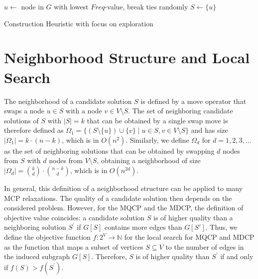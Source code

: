 \documentclass[draft,final]{vutinfth} %
\begin{document}
\begin{algorithm}
    \DontPrintSemicolon
    $u \gets $ node in $G$ with lowest $Freq$-value, break ties randomly \;
    $S \gets \{u\}$ \;
    \label{alg:exploration-construction-while-end}
    \caption{Construction Heuristic with focus on exploration}
    \label{alg:exploration-construction}
\end{algorithm}

\section{Neighborhood Structure and Local Search} \label{sec:neighborhood-structure}

The neighborhood of a candidate solution $S$ is defined by a move operator that swaps a node $u \in S$ with a node $v \in V \setminus S$. The set of neighboring candidate solutions of $S$ with $|S| = k$ that can be obtained by a single swap move is therefore defined as $\Omega_1 = \{ (S \setminus \{u\}) \cup \{v\} \mid u \in S, v \in V \setminus S \}$ and has size $|\Omega_1| = k \cdot (n-k)$, which is in $O(n^2)$. Similarly, we define $\Omega_d$ for $d=1,2,3,\dots$ as the set of neighboring solutions that can be obtained by swapping $d$ nodes from $S$ with $d$ nodes from $V \setminus S$, obtaining a neighborhood of size $|\Omega_d| = \binom{k}{d} \cdot \binom{n-k}{d}$, which is in $O(n^{2d})$. 

In general, this definition of a neighborhood structure can be applied to many MCP relaxations. The quality of a candidate solution then depends on the considered problem. However, for the MQCP and the MDCP, the definition of objective value coincides: a candidate solution $S$ is of higher quality than a neighboring solution $S^\prime$ if $G[S]$ contains more edges than $G[S']$. Thus, we define the objective function $f \colon 2^V \rightarrow \mathbb{N}$ for the local search for MQCP and MDCP as the function that maps a subset of vertices $S \subseteq V$ to the number of edges in the induced subgraph $G[S]$. Therefore, $S$ is of higher quality than $S^\prime$ if and only if $f(S) > f(S^\prime)$. 
\end{document}
